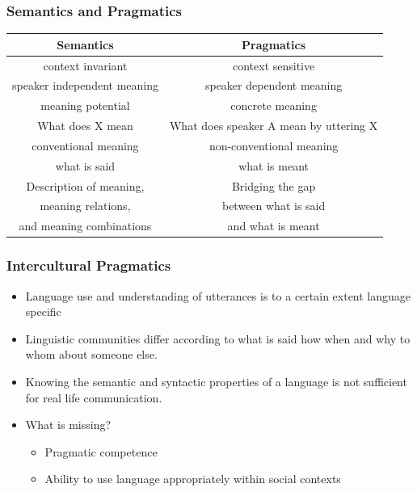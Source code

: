 \documentclass[12pt, table]{beamer}
\begin{document}
\begin{frame}
\frametitle{Semantics and Pragmatics}
\footnotesize{
\begin{tabularx}{\textwidth}{cc}
\hline
\textbf{Semantics} & \textbf{Pragmatics} \\
\hline
context invariant & context sensitive \\
speaker independent meaning & speaker dependent meaning \\
meaning potential & concrete meaning \\
What does X mean & What does speaker A mean by uttering X \\
conventional meaning & non-conventional meaning \\
what is said & what is meant \\
Description of meaning, & Bridging the gap \\
meaning relations, & between what is said \\
and meaning combinations & and what is meant \\
\hline
\end{tabularx}}
\end{frame}

\begin{frame}
\frametitle{Intercultural Pragmatics}
\begin{itemize}
\item Language use and understanding of utterances is to a certain extent language specific
\item Linguistic communities differ according to what is said how when and why to whom about someone else.
\item Knowing the semantic and syntactic properties of a language is not sufficient for real life communication.
\item What is missing?
\begin{itemize}
\item Pragmatic competence
\item Ability to use language appropriately within social contexts
\end{itemize}
\end{itemize}
\end{frame}
\end{document}
